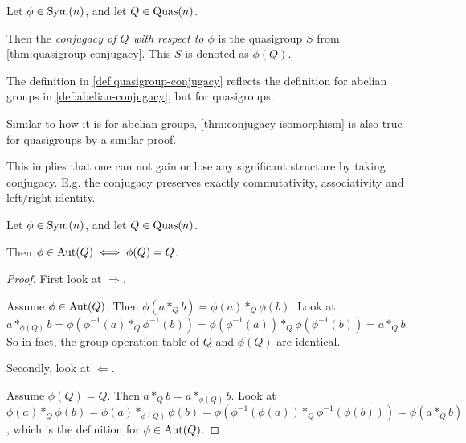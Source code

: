\begin{definition} \label{def:quasigroup-conjugacy}
    Let \( \phi \in \operatorname{Sym}(n) \), and let \( Q \in \operatorname{Quas}(n) \).

    Then the \emph{conjugacy of \( Q \) with respect to \( \phi \)} is the quasigroup \( S \) from \autoref{thm:quasigroup-conjugacy}. This \( S \) is denoted as \( \phi(Q) \).
\end{definition}

\begin{remark}
    The definition in \autoref{def:quasigroup-conjugacy} reflects the definition for abelian groups in \autoref{def:abelian-conjugacy}, but for quasigroups.
\end{remark}

\begin{remark}
    Similar to how it is for abelian groups, \autoref{thm:conjugacy-isomorphism} is also true for quasigroups by a similar proof.

    This implies that one can not gain or lose any significant structure by taking conjugacy. E.g. the conjugacy preserves exactly commutativity, associativity and left/right identity.
\end{remark}

\begin{theorem} \label{thm:quasi-automorphism-iff-self-conjugate}
    Let \( \phi \in \operatorname{Sym}(n) \), and let \( Q \in \operatorname{Quas}(n) \).

    Then \( \phi \in \operatorname{Aut}(Q) \iff \phi(Q) = Q \).
\end{theorem}
\begin{proof}
    First look at \( \Rightarrow \).

    Assume \( \phi \in \operatorname{Aut}(Q) \). Then \( \phi(a *_Q b) = \phi(a) *_Q \phi(b) \). Look at \( a *_{\phi(Q)} b = \phi(\phi^{-1}(a) *_Q \phi^{-1}(b)) = \phi(\phi^{-1}(a)) *_Q \phi(\phi^{-1}(b)) = a *_Q b \). So in fact, the group operation table of \( Q \) and \( \phi(Q) \) are identical.

    Secondly, look at \( \Leftarrow \).

    Assume \( \phi(Q) = Q \). Then \( a *_Q b = a *_{\phi(Q)} b \). Look at \( \phi(a) *_Q \phi(b) = \phi(a) *_{\phi(Q)} \phi(b) = \phi(\phi^{-1}(\phi(a)) *_Q \phi^{-1}(\phi(b))) = \phi(a *_Q b) \), which is the definition for \( \phi \in \operatorname{Aut}(Q) \). 
\end{proof}

